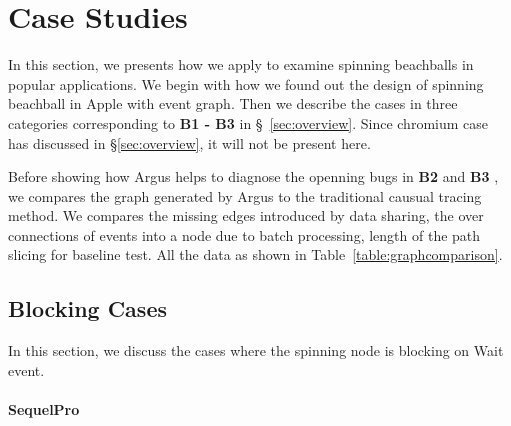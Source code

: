 \section{Case Studies}\label{sec:casestudy}

In this section, we presents how we apply \xxx to examine spinning beachballs
in \nbug popular applications. We begin with how we found out the design of
spinning beachball in Apple with event graph. Then we describe the cases in
three categories corresponding to \textbf{B1 - B3} in \S~\ref{sec:overview}.
Since chromium case has discussed in \S\ref{sec:overview}, it will not
be present here.



\indent Before showing how Argus helps to diagnose the openning bugs in
\textbf{B2} and \textbf{B3} , we compares the graph generated by Argus to the
traditional causual tracing method. We compares the missing edges introduced
by data sharing, the over connections of events into a node due to batch
processing, length of the path slicing for baseline test. All the data as shown
in Table~\ref{table:graphcomparison}.




\subsection{Blocking Cases}
In this section, we discuss the cases where the spinning node is blocking on
Wait event.
\paragraph{SequelPro}

%
%
